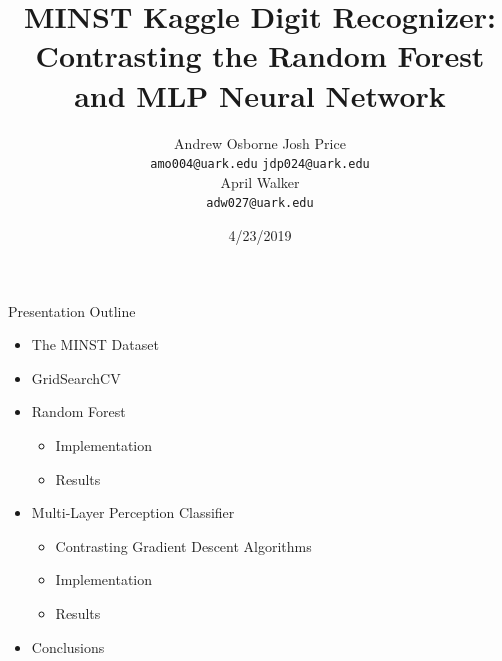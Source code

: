 \documentclass[titlepage,leqno]{beamer}%
\begin{document}
\title{MINST Kaggle Digit Recognizer: Contrasting the Random Forest and MLP Neural Network}
\author{%
   Andrew Osborne \hspace{2.75cm} Josh Price\\
   \texttt{amo004@uark.edu} \hspace{1.75cm} \texttt{jdp024@uark.edu} \\
   \vspace{4mm}
   April Walker \\
   \texttt{adw027@uark.edu}
}

\date{4/23/2019}
\maketitle
\begin{frame}{Presentation Outline}
	\begin{itemize}
		\item The MINST Dataset
		\item GridSearchCV
		\item Random Forest
		\begin{itemize}
			\item Implementation
			\item Results
		\end{itemize}
		\item Multi-Layer Perception Classifier
		\begin{itemize}
			\item Contrasting Gradient Descent Algorithms
			\item Implementation
			\item Results
		\end{itemize}
		\item{Conclusions}
	\end{itemize}
\end{frame}
\end{document}
